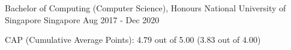 

\begin{cventries}

  \cventry
  {Bachelor of Computing (Computer Science), Honours} %
  {National University of Singapore} %
  {Singapore} %
  {Aug 2017 - Dec 2020} %
  {
    \begin{cvitems} %
      \item {CAP (Cumulative Average Points): 4.79 out of 5.00 (3.83 out of 4.00)}
    \end{cvitems}
  }




\end{cventries}
